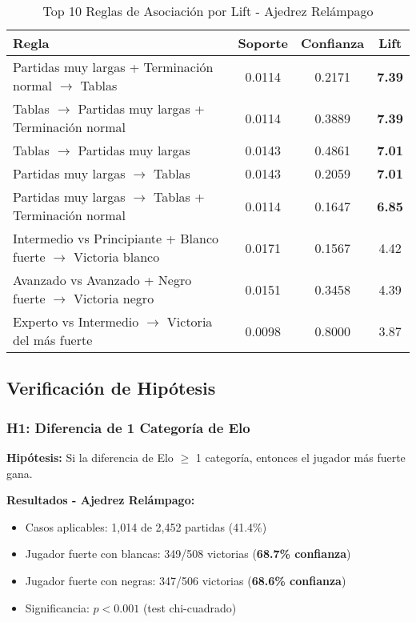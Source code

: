\documentclass[11pt,a4paper]{article}
\begin{document}
\begin{table}[H]
\centering
\caption{Top 10 Reglas de Asociaci\'on por Lift - Ajedrez Rel\'ampago}
\label{tab:top_rules}
\small
\begin{tabular}{@{}p{7cm}ccc@{}}
\toprule
\textbf{Regla} & \textbf{Soporte} & \textbf{Confianza} & \textbf{Lift} \\
\midrule
Partidas muy largas + Terminaci\'on normal $\rightarrow$ Tablas & 0.0114 & 0.2171 & \textbf{7.39} \\
Tablas $\rightarrow$ Partidas muy largas + Terminaci\'on normal & 0.0114 & 0.3889 & \textbf{7.39} \\
Tablas $\rightarrow$ Partidas muy largas & 0.0143 & 0.4861 & \textbf{7.01} \\
Partidas muy largas $\rightarrow$ Tablas & 0.0143 & 0.2059 & \textbf{7.01} \\
Partidas muy largas $\rightarrow$ Tablas + Terminaci\'on normal & 0.0114 & 0.1647 & \textbf{6.85} \\
Intermedio vs Principiante + Blanco fuerte $\rightarrow$ Victoria blanco & 0.0171 & 0.1567 & 4.42 \\
Avanzado vs Avanzado + Negro fuerte $\rightarrow$ Victoria negro & 0.0151 & 0.3458 & 4.39 \\
Experto vs Intermedio $\rightarrow$ Victoria del m\'as fuerte & 0.0098 & 0.8000 & 3.87 \\
\bottomrule
\end{tabular}
\end{table}

\subsection{Verificaci\'on de Hip\'otesis}

\subsubsection{H1: Diferencia de 1 Categor\'ia de Elo}

\textbf{Hip\'otesis:} Si la diferencia de Elo $\geq$ 1 categor\'ia, entonces el jugador m\'as fuerte gana.

\textbf{Resultados - Ajedrez Rel\'ampago:}
\begin{itemize}
\item Casos aplicables: 1,014 de 2,452 partidas (41.4\%)
\item Jugador fuerte con blancas: 349/508 victorias (\textbf{68.7\% confianza})
\item Jugador fuerte con negras: 347/506 victorias (\textbf{68.6\% confianza})
\item Significancia: $p < 0.001$ (test chi-cuadrado)
\end{itemize}
\end{document}
